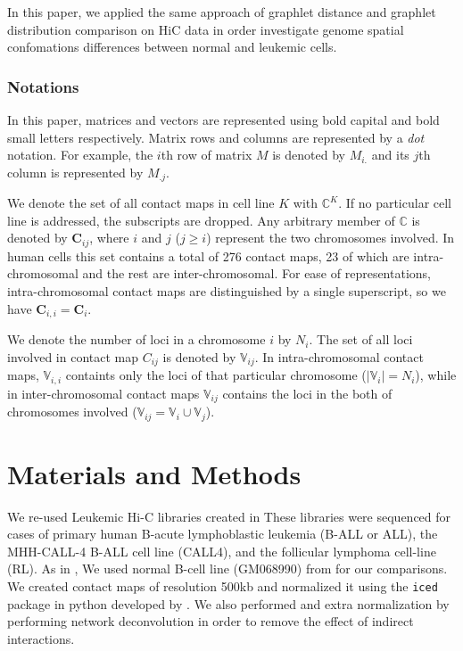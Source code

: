 \documentclass[a4,center,fleqn]{NAR}
\begin{document}
In this paper, we applied the same approach of graphlet distance
and graphlet distribution comparison on HiC data
in order investigate genome spatial confomations differences
between normal and leukemic cells.

\enlargethispage{-65.1pt}

\subsubsection{Notations}
In this paper, matrices and vectors are represented using bold
capital and bold small letters respectively.
Matrix rows and columns are represented by a \textit{dot}
notation. For example, the $i$th row of matrix $M$ is
denoted by $M_{i.}$ and its $j$th column is represented
by $M_{.j}$.

We denote the set of all contact maps in cell line $K$ with 
$\mathbb{C}^K$. If no particular cell line is addressed, the
subscripts are dropped.
Any arbitrary member of $\mathbb{C}$ is denoted by 
$\mathbf{C}_{ij}$, where $i$ and $j$ ($j \ge i$) 
represent the two chromosomes involved. 
In human cells this set contains a total of 276 contact maps,
23 of which are intra-chromosomal and the rest are inter-chromosomal.
For ease of representations, intra-chromosomal contact maps are
distinguished by a single superscript, so we have $\mathbf{C}_{i,i} =
\mathbf{C}_i$.

We denote the number of loci in a chromosome $i$ by $N_i$.
The set of all loci involved in contact map $C_{ij}$ is denoted 
by $\mathbb{V}_{ij}$.
In intra-chromosomal contact maps, $\mathbb{V}_{i,i}$ containts only the 
loci of that particular chromosome ($|\mathbb{V}_i| = N_i$), while in 
inter-chromosomal contact maps $\mathbb{V}_{ij}$ contains the loci in
the both of chromosomes involved 
($\mathbb{V}_{ij} = \mathbb{V}_i \cup \mathbb{V}_j$).


\section{Materials and Methods}
We re-used Leukemic Hi-C libraries 
created in \cite{wang2013properties}
These libraries were sequenced 
for cases of primary human B-acute
lymphoblastic leukemia (B-ALL or ALL), 
the MHH-CALL-4 B-ALL cell
line (CALL4), 
and the follicular lymphoma cell-line (RL).
As in \cite{wang2013properties}, 
We used normal B-cell line (GM068990)
from \cite{lieberman2009comprehensive} 
for our comparisons.
We created contact maps of resolution
500kb and normalized it using 
the \texttt{iced} package in python
developed by \cite{servant2015hic}.
We also performed and extra normalization by
performing network deconvolution \cite{feizi2013network}
in order to remove
the effect of indirect interactions.
\end{document}
